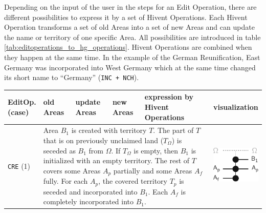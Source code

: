 Depending on the input of the user in the steps for an Edit Operation, there are different possibilities to express it by a set of Hivent Operations. Each Hivent Operation transforms a set of old Areas into a set of new Areas and can update the name or territory of one specific Area. All possibilities are introduced in table \ref{tab:editoperations_to_hg_operations}. Hivent Operations are combined when they happen at the same time. In the example of the German Reunification, East Germany was incorporated into West Germany which at the same time changed its short name to ``Germany'' (\texttt{INC + NCH}).

\begin{center}
\begin{longtable}{m{1.2cm} m{0.95cm} m{0.95cm} m{0.95cm} m{6.0cm} m{2.3cm}}
  \toprule

  \pbox{1.2cm}{EditOp.\\(case)} &
  \pbox{0.95cm}{old\\Areas\\[-0.8em]} &
  \pbox{0.95cm}{update\\Areas\\[-0.8em]} &
  \pbox{0.95cm}{new\\Areas\\[-0.8em]} &
  expression by Hivent Operations \protect\footnotemark &
  visualization \\
  \midrule
  \endhead



  \multirow{9}{*}{\texttt{CRE} (1)} &
  \multicolumn{4}{p{10cm}}{
    Area $B_1$ is created with territory $T$. The part of $T$ that is on previously unclaimed land ($T_\Omega$) is seceded as $B_1$ from $\Omega$.
    If $T_\Omega$ is empty, then $B_1$ is initialized with an empty territory.
    The rest of $T$ covers some Areas $A_p$ partially and some Areas $A_f$ fully.
    For each $A_p$, the covered territory $T_p$ is seceded and incorporated into $B_1$.
    Each $A_f$ is completely incorporated into $B_1$.
  } &
  \multirow{9}{*}{
    \includegraphics[width=2.5cm]{graphics/development/editing_hivent_data/edit_to_hivent_operations/CRE_to_SEC+UNI}
  } \\


\end{longtable}
\end{center}
